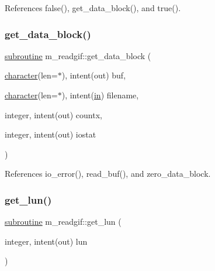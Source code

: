 References false(), get\+\_\+data\+\_\+block(), and true().

\mbox{\label{namespacem__readgif_ace6e51d0293107696bd1482348414a43}} 
\subsubsection{\texorpdfstring{get\+\_\+data\+\_\+block()}{get\_data\_block()}}
{\footnotesize\ttfamily \hyperlink{M__stopwatch_83_8txt_acfbcff50169d691ff02d4a123ed70482}{subroutine} m\+\_\+readgif\+::get\+\_\+data\+\_\+block (\begin{DoxyParamCaption}\item[{\hyperlink{option__stopwatch_83_8txt_abd4b21fbbd175834027b5224bfe97e66}{character}(len=$\ast$), intent(out)}]{buf,  }\item[{\hyperlink{option__stopwatch_83_8txt_abd4b21fbbd175834027b5224bfe97e66}{character}(len=$\ast$), intent(\hyperlink{M__journal_83_8txt_afce72651d1eed785a2132bee863b2f38}{in})}]{filename,  }\item[{integer, intent(out)}]{countx,  }\item[{integer, intent(out)}]{iostat }\end{DoxyParamCaption})\hspace{0.3cm}{\ttfamily [private]}}



References io\+\_\+error(), read\+\_\+buf(), and zero\+\_\+data\+\_\+block.

\mbox{\label{namespacem__readgif_a7109d632cddcb8d66729d25bbed5c33c}} 
\subsubsection{\texorpdfstring{get\+\_\+lun()}{get\_lun()}}
{\footnotesize\ttfamily \hyperlink{M__stopwatch_83_8txt_acfbcff50169d691ff02d4a123ed70482}{subroutine} m\+\_\+readgif\+::get\+\_\+lun (\begin{DoxyParamCaption}\item[{integer, intent(out)}]{lun }\end{DoxyParamCaption})\hspace{0.3cm}{\ttfamily [private]}}



